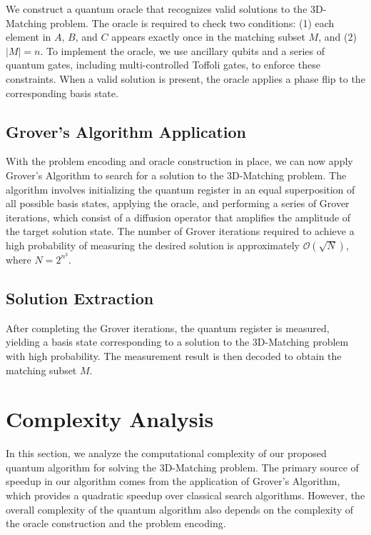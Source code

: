 We construct a quantum oracle that recognizes valid solutions to the 3D-Matching problem. The oracle is required to check two conditions: (1) each element in $A$, $B$, and $C$ appears exactly once in the matching subset $M$, and (2) $|M| = n$. To implement the oracle, we use ancillary qubits and a series of quantum gates, including multi-controlled Toffoli gates, to enforce these constraints. When a valid solution is present, the oracle applies a phase flip to the corresponding basis state.

\subsection{Grover's Algorithm Application}

With the problem encoding and oracle construction in place, we can now apply Grover's Algorithm to search for a solution to the 3D-Matching problem. The algorithm involves initializing the quantum register in an equal superposition of all possible basis states, applying the oracle, and performing a series of Grover iterations, which consist of a diffusion operator that amplifies the amplitude of the target solution state. The number of Grover iterations required to achieve a high probability of measuring the desired solution is approximately $\mathcal{O}(\sqrt{N})$, where $N = 2^{n^3}$.

\subsection{Solution Extraction}

After completing the Grover iterations, the quantum register is measured, yielding a basis state corresponding to a solution to the 3D-Matching problem with high probability. The measurement result is then decoded to obtain the matching subset $M$.

\section{Complexity Analysis} \label{sec:complexity_analysis}

In this section, we analyze the computational complexity of our proposed quantum algorithm for solving the 3D-Matching problem. The primary source of speedup in our algorithm comes from the application of Grover's Algorithm, which provides a quadratic speedup over classical search algorithms. However, the overall complexity of the quantum algorithm also depends on the complexity of the oracle construction and the problem encoding.

